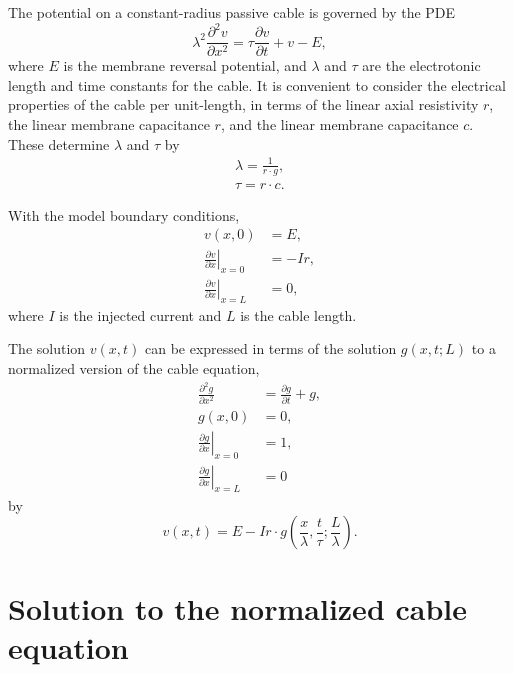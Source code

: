 \documentclass[parskip=half]{scrartcl}
\begin{document}
The potential on a constant-radius passive cable is governed by the PDE
\begin{equation}
    \lambda^2 \frac{\partial^2 v}{\partial x^2} =
    \tau\frac{\partial v}{\partial t} + v - E,
\end{equation}
where $E$ is the membrane reversal potential, and $\lambda$ and $\tau$ are the
electrotonic length and time constants for the cable. It is convenient
to consider the electrical properties of the cable per unit-length, in terms
of the linear axial resistivity $r$, the linear membrane capacitance $r$,
and the linear membrane capacitance $c$. These determine $\lambda$ and $\tau$ by
\begin{gather*}
    \lambda = \frac{1}{r\cdot g},\\
    \tau = r\cdot c.
\end{gather*}

With the model boundary conditions,
\begin{subequations}
    \begin{align}
	v(x, 0) &= E, \\
	\left.\frac{\partial v}{\partial x}\right\vert_{x=0} & = -Ir, \\
	 \left.\frac{\partial v}{\partial x}\right\vert_{x=L} & = 0,
    \end{align}
\end{subequations}
where $I$ is the injected current and $L$ is the cable length.

The solution $v(x, t)$ can be expressed in terms of the solution $g(x, t; L)$
to a normalized version of the cable equation,
\begin{subequations}
    \begin{align}
	\label{eq:normcable}
	\frac{\partial^2 g}{\partial x^2} & =
	\frac{\partial g}{\partial t} + g,
        \\
	\label{eq:normcableinitial}
	g(x, 0) &= 0,
	\\
	\label{eq:normcableleft}
	\left.\frac{\partial g}{\partial x}\right\vert_{x=0} & = 1,
	\\
	\label{eq:normcableright}
	\left.\frac{\partial g}{\partial x}\right\vert_{x=L} & = 0
    \end{align}
\end{subequations}
by
\begin{equation}
    v(x, t)= E - Ir \cdot g(\frac{x}{\lambda}, \frac{t}{\tau};  \frac{L}{\lambda}).
\end{equation}

\section{Solution to the normalized cable equation}
\end{document}
